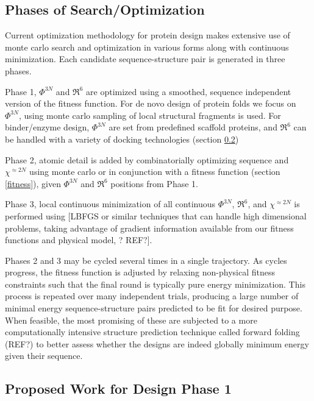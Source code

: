 \documentclass{article}
\begin{document}
\subsection{Phases of Search/Optimization}

Current optimization methodology for protein design makes extensive use of monte
carlo search and optimization in various forms along with continuous
minimization. Each candidate sequence-structure pair is generated in three
phases.

Phase 1, $\Phi^{3N}$ and $\Re^6$ are optimized using a smoothed, sequence
independent version of the fitness function. For de novo design of protein folds
we focus on $\Phi^{3N}$, using monte carlo sampling of local structural fragments is
used. For binder/enzyme design, $\Phi^{3N}$ are set from predefined scaffold
proteins, and $\Re^6$ can be handled with a variety of docking technologies
(section \ref{proposed1})

Phase 2, atomic detail is added by combinatorially optimizing
sequence and $\chi^{\approx2N}$ using monte carlo or in conjunction with a
fitness function (section \ref{fitness}),
given $\Phi^{3N}$ and $\Re^6$ positions from Phase 1.

Phase 3, local continuous minimization of all continuous $\Phi^{3N}$, $\Re^6$,
and $\chi^{\approx2N}$ is performed using [LBFGS or similar techniques that can
handle high dimensional problems, taking advantage
of gradient information available from our fitness functions and physical model,
? REF?].

Phases 2 and 3 may be cycled several times in a single trajectory. As
cycles progress, the fitness function is adjusted by relaxing non-physical
fitness constraints such that the final round is typically pure energy
minimization. This process is repeated over many independent trials, producing a
large number of minimal energy sequence-structure pairs predicted to be fit for
desired purpose. When feasible, the most promising of these are subjected to a
more computationally intensive structure prediction technique called forward
folding (REF?) to better assess whether the designs are indeed globally minimum
energy given their sequence.

\subsection{Proposed Work for Design Phase 1}\label{proposed1}
\end{document}
